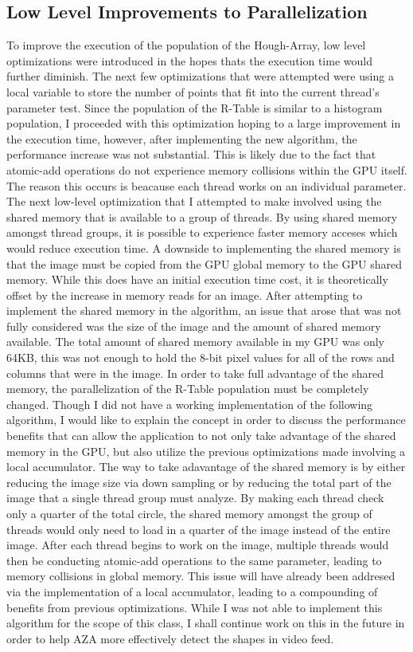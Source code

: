 \documentclass[conference]{IEEEtran}
\begin{document}
\subsection{Low Level Improvements to Parallelization}
To improve the execution of the population of the Hough-Array, low level optimizations were introduced in the hopes thats the execution time would further diminish. 
The next few optimizations that were attempted were using a local variable to store the number of points that fit into the current thread's parameter test. 
Since the population of the R-Table is similar to a histogram population, I proceeded with this optimization hoping to a large improvement in the execution time, however, after implementing the new algorithm, the performance increase was not substantial. 
This is likely due to the fact that atomic-add operations do not experience memory collisions within the GPU itself. 
The reason this occurs is beacause each thread works on an individual parameter. 
The next low-level optimization that I attempted to make involved using the shared memory that is available to a group of threads. 
By using shared memory amongst thread groups, it is possible to experience faster memory acceses which would reduce execution time. 
A downside to implementing the shared memory is that the image must be copied from the GPU global memory to the GPU shared memory. 
While this does have an initial execution time cost, it is theoretically offset by the increase in memory reads for an image. 
After attempting to implement the shared memory in the algorithm, an issue that arose that was not fully considered was the size of the image and the amount of shared memory available. 
The total amount of shared memory available in my GPU was only 64KB, this was not enough to hold the 8-bit pixel values for all of the rows and columns that were in the image. 
In order to take full advantage of the shared memory, the parallelization of the R-Table population must be completely changed. 
Though I did not have a working implementation of the following algorithm, I would like to explain the concept in order to discuss the performance benefits that can allow the application to not only take advantage of the shared memory in the GPU, but also utilize the previous optimizations made involving a local accumulator. 
The way to take adavantage of the shared memory is by either reducing the image size via down sampling or by reducing the total part of the image that a single thread group must analyze. 
By making each thread check only a quarter of the total circle, the shared memory amongst the group of threads would only need to load in a quarter of the image instead of the entire image. 
After each thread begins to work on the image, multiple threads would then be conducting atomic-add operations to the same parameter, leading to memory collisions in global memory. 
This issue will have already been addresed via the implementation of a local accumulator, leading to a compounding of benefits from previous optimizations. 
While I was not able to implement this algorithm for the scope of this class, I shall continue work on this in the future in order to help AZA more effectively detect the shapes in video feed. 
\end{document}
